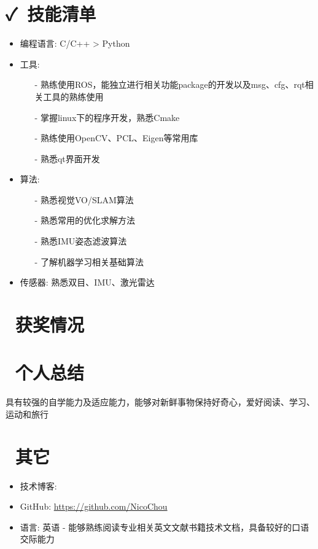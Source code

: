 \documentclass{resume}
\begin{document}
\section{\faCheck\ 技能清单}
\begin{itemize}%
  \item 编程语言: C/C++ > Python
  \item 工具:
    \begin{itemize}
        \item[-] 熟练使用ROS，能独立进行相关功能package的开发以及msg、cfg、rqt相关工具的熟练使用
        \item[-] 掌握linux下的程序开发，熟悉Cmake
        \item[-] 熟练使用OpenCV、PCL、Eigen等常用库
        \item[-] 熟悉qt界面开发
    \end{itemize}
  \item 算法:
    \begin{itemize}
        \item[-] 熟悉视觉VO/SLAM算法
        \item[-] 熟悉常用的优化求解方法
        \item[-] 熟悉IMU姿态滤波算法
        \item[-] 了解机器学习相关基础算法
    \end{itemize}
  \item 传感器: 熟悉双目、IMU、激光雷达
\end{itemize}

\section{\faMapO\ 获奖情况}


\section{\faComment \ 个人总结}
具有较强的自学能力及适应能力，能够对新鲜事物保持好奇心，爱好阅读、学习、运动和旅行

\section{\faInfoCircle \ 其它}
\begin{itemize}[parsep=0.5ex]
  \item 技术博客: 
  \item GitHub: \href{https://github.com/NicoChou}{https://github.com/NicoChou}
  \item 语言: 英语 - 能够熟练阅读专业相关英文文献书籍技术文档，具备较好的口语交际能力
\end{itemize}

%
%
\end{document}
